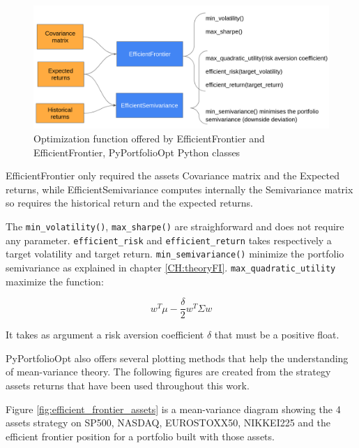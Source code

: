 \begin{figure}
    \centering
    \includegraphics[width=\textwidth]{Appendix/pyportfolioopt_methods.png}
    \caption[PyPortfolioOpt optimization functions]{Optimization function offered by EfficientFrontier and EfficientFrontier, PyPortfolioOpt Python classes}
    \label{fig:pyportfolioopt_methods}
\end{figure}

EfficientFrontier only required the assets Covariance matrix and the Expected returns, while EfficientSemivariance computes internally the Semivariance matrix so requires the historical return and the expected returns.

The \texttt{min\_volatility()}, \texttt{max\_sharpe()} are straighforward and does not require any parameter. \texttt{efficient\_risk} and \texttt{efficient\_return} takes respectively a target volatility and target return. \texttt{min\_semivariance()} minimize the portfolio semivariance as explained in chapter \ref{CH:theoryFI}. \texttt{max\_quadratic\_utility} maximize the function: 

$$ w^T \mu - \frac{\delta}{2} w^T \Sigma w $$ 

It takes as argument a risk aversion coefficient $\delta$ that must be a positive float.  

PyPortfolioOpt also offers several plotting methods that help the understanding of mean-variance theory. The following figures are created from the strategy assets returns that have been used throughout this work. 

Figure \ref{fig:efficient_frontier_assets} is a mean-variance diagram showing the 4 assets strategy on SP500, NASDAQ, EUROSTOXX50, NIKKEI225 and the efficient frontier position for a portfolio built with those assets.

